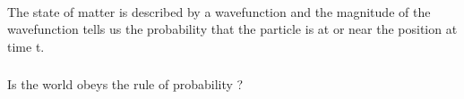 \begin{frame}  
    \begin{tcolorbox3}[Conclusion]
        ~~\\
       {\large The state of matter is described by a wavefunction and the magnitude of the wavefunction 
       tells us the probability that the particle is at or near the position at time t.}
    \end{tcolorbox3} 
\end{frame} 

\begin{frame}
    \frametitle{}
    \centering
    {
      \large  {Is the world obeys the rule of probability ?}
    }
\end{frame}

